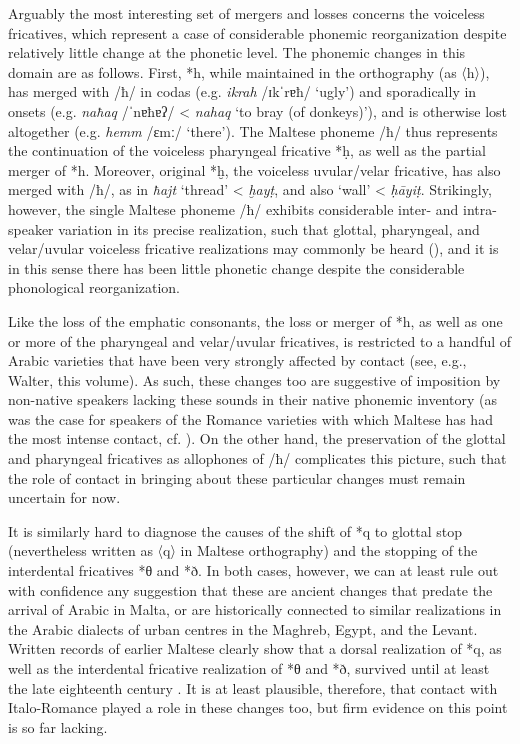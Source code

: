 \documentclass[output=paper]{langsci/langscibook}
\begin{document}
Arguably the most interesting set of mergers and losses concerns the voiceless fricatives, which represent a case of considerable phonemic reorganization despite relatively little change at the phonetic level. The phonemic changes in this domain are as follows. First, *h, while maintained in the orthography (as 〈h〉), has merged with /ħ/ in codas (e.g. \textit{ikrah} /ɪkˈrɐħ/ `ugly') and sporadically in onsets (e.g. \textit{naħaq} /ˈnɐħɐʔ/ < \textit{nahaq} `to bray (of donkeys)'), and is otherwise lost altogether (e.g. \textit{hemm} /ɛmː/ `there'). The Maltese phoneme /ħ/ thus represents the continuation of the voiceless pharyngeal fricative *\d{h}, as well as the partial merger of *h. Moreover, original *ḫ, the voiceless uvular/velar fricative, has also merged with /ħ/, as in \textit{ħajt} `thread' < \textit{ḫay\d{t}}, and also `wall' < \textit{\d{h}\={a}yi\d{t}}. Strikingly, however, the single Maltese phoneme /ħ/ exhibits considerable inter- and intra-speaker variation in its precise realization, such that glottal, pharyngeal, and velar/uvular voiceless fricative realizations may commonly be heard (\citealt[301]{BorgAzzopardi-Alexander1997}), and it is in this sense there has been little phonetic change despite the considerable phonological reorganization.  

Like the loss of the emphatic consonants, the loss or merger of *h, as well as one or more of the pharyngeal and velar/uvular fricatives, is restricted to a handful of Arabic varieties that have been very strongly affected by contact (see, e.g., Walter, this volume). As such, these changes too are suggestive of imposition by non-native speakers lacking these sounds in their native phonemic inventory (as was the case for speakers of the Romance varieties with which Maltese has had the most intense contact, cf. \citealt[141--142] {Loporcaro2011}). On the other hand, the preservation of the glottal and pharyngeal fricatives as allophones of /ħ/ complicates this picture, such that the role of contact in bringing about these particular changes must remain uncertain for now. 

It is similarly hard to diagnose the causes of the shift of *q to glottal stop (nevertheless written as 〈q〉 in Maltese orthography) and the stopping of the interdental fricatives *θ and *ð. In both cases, however, we can at least rule out with confidence any suggestion that these are ancient changes that predate the arrival of Arabic in Malta, or are historically connected to similar realizations in the Arabic dialects of urban centres in the Maghreb, Egypt, and the Levant. Written records of earlier Maltese clearly show that a dorsal realization of *q, as well as the interdental fricative realization of *θ and *ð, survived until at least the late eighteenth century \citep{Avram2012,Avram2014Maltese}. It is at least plausible, therefore, that contact with Italo-Romance played a role in these changes too, but firm evidence on this point is so far lacking.
\end{document}
